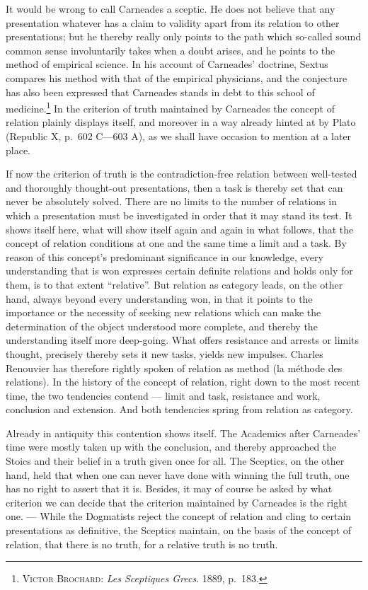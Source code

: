 \documentclass[12pt]{article}
\newcommand{\opage}[1]{\marginnote{\footnotesize\textit{[#1]}}}
\begin{document}
It would be wrong to call Carneades a sceptic. He does not believe that any
presentation whatever has a claim to validity apart from its relation to
other presentations; but he thereby really only points to the path which
so-called sound common sense involuntarily takes when a doubt arises, and he
points to the method of empirical science. In his account of Carneades'
doctrine, Sextus compares his method with that of the empirical physicians,
and the conjecture has also been expressed that Carneades stands in debt to
this school of medicine.\footnote{\textsc{Victor Brochard}: \textit{Les
Sceptiques Grecs}. 1889, p.~183.} In the criterion of truth maintained by
Carneades the concept of relation plainly displays itself, and moreover in a
way already hinted at by Plato (Republic X, p.~602 C---603 A), as we shall
have occasion to mention at a later place.

If now the criterion of truth is the contradiction-free relation between
well-tested and thoroughly thought-out presentations, then a task is thereby
set that can never be absolutely solved. There are no limits to the number
of relations in which a presentation must be investigated in order that it
may stand its test. It shows itself here, what will show itself again and
again in what follows, that the concept of relation conditions at one and
the same time a limit and a task. By reason of this concept's predominant
significance in our knowledge, every understanding that is won expresses
certain definite relations and holds \opage{8}only for them, is to that extent
``relative''. But relation as category leads, on the other hand, always
beyond every understanding won, in that it points to the importance or the
necessity of seeking new relations which can make the determination of the
object understood more complete, and thereby the understanding itself more
deep-going. What offers resistance and arrests or limits thought, precisely
thereby sets it new tasks, yields new impulses. Charles Renouvier has
therefore rightly spoken of relation as method (la méthode des relations).
In the history of the concept of relation, right down to the most recent
time, the two tendencies contend --- limit and task, resistance and work,
conclusion and extension. And both tendencies spring from relation as
category.

Already in antiquity this contention shows itself. The Academics after
Carneades' time were mostly taken up with the conclusion, and thereby
approached the Stoics and their belief in a truth given once for all. The
Sceptics, on the other hand, held that when one can never have done with
winning the full truth, one has no right to assert that it is. Besides, it
may of course be asked by what criterion we can decide that the criterion
maintained by Carneades is the right one. --- While the Dogmatists reject
the concept of relation and cling to certain presentations as definitive,
the Sceptics maintain, on the basis of the concept of relation, that there
is no truth, for a relative truth is no truth.
\end{document}
